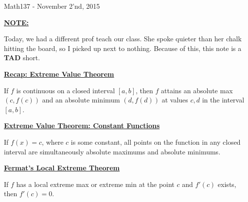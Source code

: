 \documentclass{letter}
\begin{document}
	\begin{center}
		\LARGE Math137 - November 2'nd, 2015
	\end{center}
	\vspace{0.25 in}
	\underline{\textbf{NOTE:}}
	
	Today, we had a different prof teach our class. She spoke quieter than her chalk hitting the board, so I picked up next to nothing. Because of this, this note is a \textbf{TAD} short.
	
	\vspace{0.25 in}
	\underline{\textbf{Recap: Extreme Value Theorem}}

	If $f$ is continuous on a closed interval $[a, b]$, then $f$ attains an absolute max $(c, f(c))$ and an absolute minimum $(d, f(d))$ at values $c, d$ in the interval $[a, b]$.
	
	\vspace{0.25 in}
	\underline{\textbf{Extreme Value Theorem: Constant Functions}}
	
	If $f(x) = c$, where $c$ is some constant, all points on the function in any closed interval are simultaneously absolute maximums and absolute minimums.
	
	\vspace{0.25 in}
	\underline{\textbf{Fermat's Local Extreme Theorem}}
	
	If $f$ has a local extreme max or extreme min at the point $c$ and $f'(c)$ exists, then $f'(c) = 0$.
	
	
	
	
	
\end{document}
